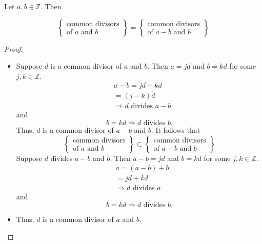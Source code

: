 \documentclass[11pt, draft]{article}
\begin{document}
\begin{fact} Let $a, b \in \mathbb{Z}$. Then

    \[
        \left\{
        \begin{array}{l}
            \text{common divisors} \\
            \text{of } a \text{ and } b
        \end{array}
        \right\}
        =
        \left\{
        \begin{array}{l}
            \text{common divisors} \\
            \text{of } a - b \text{ and } b
        \end{array}
        \right\}
    \]
\end{fact}
\begin{proof}
    \begin{itemize}
        \item Suppose $d$ is a common divisor of $a$ and $b$. Then $a = jd$ and $b = kd$ for
              some $j, k \in \mathbb{Z}$.
              \[
                  \begin{aligned}
                       & a - b = jd - kd                      \\
                       & = (j - k)d                           \\
                       & \Rightarrow d \text{ divides } a - b
                  \end{aligned}
              \]
              and
              \[
                  b = kd \Rightarrow d \text{ divides } b.
              \]
              Thus, $d$ is a common divisor of $a - b$ and $b$. It follows that
              \[
                  \left\{
                  \begin{array}{l}
                      \text{common divisors} \\
                      \text{of } a \text{ and } b
                  \end{array}
                  \right\}
                  \subset
                  \left\{
                  \begin{array}{l}
                      \text{common divisors} \\
                      \text{of } a - b \text{ and } b
                  \end{array}
                  \right\}
              \]
              Suppose $d$ divides $a - b$ and $b$. Then $a - b = jd$ and $b = kd$ for some
              $j, k \in \mathbb{Z}$.
              \[
                  \begin{aligned}
                       & a = (a - b) + b                  \\
                       & = jd + kd                        \\
                       & \Rightarrow d \text{ divides } a
                  \end{aligned}
              \]
              and
              \[
                  b = kd \Rightarrow d \text{ divides } b.
              \]
        \item Thus, $d$ is a common divisor of $a$ and $b$.
    \end{itemize}
\end{proof}
\end{document}
